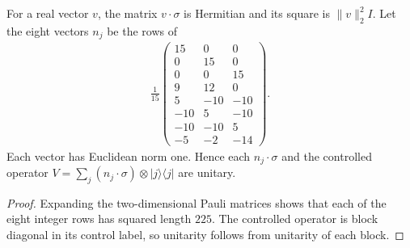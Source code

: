 \begin{lemma}
    \label{thm:mpu_pauli_control_unitary}
    \leanok
    For a real vector $v$, the matrix $v\cdot\sigma$ is Hermitian
    and its square is $\|v\|_2^2I$.
    Let the eight vectors $n_j$ be the rows of
    \begin{align}
        \frac1{15}
        \begin{pmatrix}
            15 & 0   & 0   \\0&15&0\\0&0&15\\9&12&0\\
            5  & -10 & -10 \\-10&5&-10\\-10&-10&5\\-5&-2&-14
        \end{pmatrix}.
    \end{align}
    Each vector has Euclidean norm one. Hence each $n_j\cdot\sigma$
    and the controlled operator
    $V=\sum_j(n_j\cdot\sigma)\otimes|j\rangle\langle j|$ are unitary.
\end{lemma}
\begin{proof}\leanok
    Expanding the two-dimensional Pauli matrices shows that each of the eight
    integer rows has squared length $225$.
    The controlled operator is block diagonal in its control label,
    so unitarity follows from unitarity of each block.
\end{proof}

